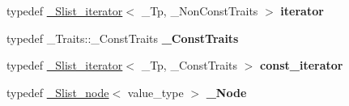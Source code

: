 \begin{DoxyCompactItemize}
typedef \hyperlink{class___slist__iterator}{\+\_\+\+Slist\+\_\+iterator}$<$ \+\_\+\+Tp, \+\_\+\+Non\+Const\+Traits $>$ {\bfseries iterator}
\item 
\mbox{\label{class___slist__iterator_abd449c05bdf42b127a533494811d80bd}} 
typedef \+\_\+\+Traits\+::\+\_\+\+Const\+Traits {\bfseries \+\_\+\+Const\+Traits}
\item 
\mbox{\label{class___slist__iterator_ad6497d2d7359c211ad5684cb7c4eb069}} 
typedef \hyperlink{class___slist__iterator}{\+\_\+\+Slist\+\_\+iterator}$<$ \+\_\+\+Tp, \+\_\+\+Const\+Traits $>$ {\bfseries const\+\_\+iterator}
\item 
\mbox{\label{class___slist__iterator_a0828f2591974bb7083830b0532e1705e}} 
typedef \hyperlink{class___slist__node}{\+\_\+\+Slist\+\_\+node}$<$ value\+\_\+type $>$ {\bfseries \+\_\+\+Node}
\end{DoxyCompactItemize}
